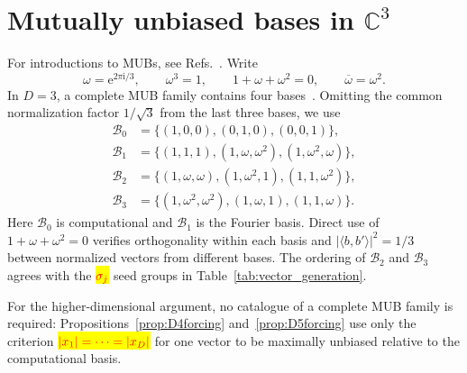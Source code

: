 \documentclass[%
  reprint,
  superscriptaddress,
  showpacs,
  showkeys,
  amsmath,amssymb,
  pra,
  longbibliography,
  floatfix,
  x11names
]{revtex4-2}
\newcommand{\ii}{\mathrm{i}}
\newenvironment{revision}{\begingroup\color{revisionblue}}{\endgroup}
\newcommand{\corrmath}[1]{\begingroup\setlength{\fboxsep}{1pt}\colorbox{yellow}{\ensuremath{\color{red}#1}}\endgroup}
\begin{document}


\bigskip
\appendix

\begin{revision}
\section{Mutually unbiased bases in $\mathbb{C}^3$}
\label{appendix:MUBsD3}

For introductions to MUBs, see Refs.~\cite{Schwinger.60,WooFie,Brierley2009,springerlink:10.1007/978-3-540-24633-6_10,durt,mcnulty2024mutually}.  Write
\[
\omega=\mathrm{e}^{2\pi\ii{}/3},\qquad
\omega^3=1,\qquad 1+\omega+\omega^2=0,
\qquad \overline{\omega}=\omega^2.
\]
In $D=3$, a complete MUB family contains four bases~\cite{ivanovic-1997}.  Omitting the common normalization factor $1/\sqrt{3}$ from the last three bases, we use
\begin{align}
\mathcal{B}_0&=\{(1,0,0),(0,1,0),(0,0,1)\}, \label{eq:B0_3}\\
\mathcal{B}_1&=\{(1,1,1),(1,\omega,\omega^2),(1,\omega^2,\omega)\}, \label{eq:B1_3}\\
\mathcal{B}_2&=\{(1,\omega,\omega),(1,\omega^2,1),(1,1,\omega^2)\}, \label{eq:B2_3}\\
\mathcal{B}_3&=\{(1,\omega^2,\omega^2),(1,\omega,1),(1,1,\omega)\}. \label{eq:B3_3}
\end{align}
Here $\mathcal{B}_0$ is computational and $\mathcal{B}_1$ is the Fourier basis.  Direct use of $1+\omega+\omega^2=0$ verifies orthogonality within each basis and $|\langle b,b'\rangle|^2=1/3$ between normalized vectors from different bases.  The ordering of $\mathcal{B}_2$ and $\mathcal{B}_3$ agrees with the \corrmath{\sigma_j} seed groups in Table~\ref{tab:vector_generation}.

For the higher-dimensional argument, no catalogue of a complete MUB family is required: Propositions~\ref{prop:D4forcing} and~\ref{prop:D5forcing} use only the criterion \corrmath{|x_1|=\cdots=|x_D|} for one vector to be maximally unbiased relative to the computational basis.
\end{revision}
\end{document}

